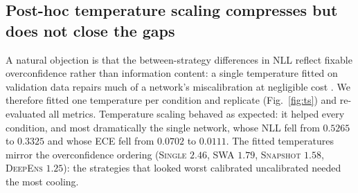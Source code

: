 \documentclass[11pt,a4paper]{article}
\newcommand{\deepens}{\textsc{DeepEns}}
\newcommand{\snapshot}{\textsc{Snapshot}}
\newcommand{\swa}{\textsc{SWA}}
\newcommand{\single}{\textsc{Single}}
\begin{document}
\subsection{Post-hoc temperature scaling compresses but does not close the
gaps}\label{sec:results-ts}

A natural objection is that the between-strategy differences in NLL reflect
fixable overconfidence rather than information content: a single temperature
fitted on validation data repairs much of a network's miscalibration at
negligible cost \citep{guo2017}. We therefore fitted one temperature per
condition and replicate (Fig.~\ref{fig:ts}) and re-evaluated all metrics.
Temperature scaling behaved as expected: it helped every condition, and
most dramatically the single network, whose NLL fell from $0.5265$ to
$0.3325$ and whose ECE fell from $0.0702$ to $0.0111$. The fitted
temperatures mirror the overconfidence ordering (\single{} $2.46$,
\swa{} $1.79$, \snapshot{} $1.58$, \deepens{} $1.25$): the strategies that
looked worst calibrated uncalibrated needed the most cooling.
\end{document}
